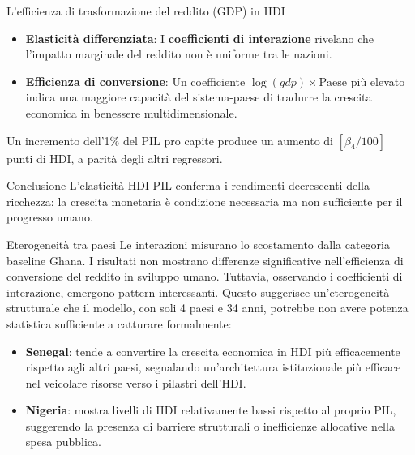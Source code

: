 \documentclass[
  ignorenonframetext,
  aspectratio=43,
]{beamer}
\begin{document}
\begin{frame}{L'efficienza di trasformazione del reddito (GDP) in HDI}
\label{lefficienza-di-trasformazione-del-reddito-gdp-in-hdi}
\begin{itemize}
  \item \textbf{Elasticità differenziata}: I \textbf{coefficienti di interazione} rivelano che l'impatto marginale del reddito non è uniforme tra le nazioni.
  \item \textbf{Efficienza di conversione}: Un coefficiente $\log(gdp) \times \text{Paese}$ più elevato indica una maggiore capacità del sistema-paese di tradurre la crescita economica in benessere multidimensionale.
\end{itemize}

Un incremento dell'1\% del PIL pro capite produce un aumento di
\([\beta_4/100]\) punti di HDI, a parità degli altri regressori.

\begin{block}{Conclusione}
L'elasticità HDI-PIL conferma i rendimenti decrescenti della ricchezza: la crescita monetaria è condizione necessaria ma non sufficiente per il progresso umano.
\end{block}
\end{frame}

\begin{frame}{Eterogeneità tra paesi}
\label{eterogeneituxe0-tra-paesi}
Le interazioni misurano lo scostamento dalla categoria baseline Ghana. I
risultati non mostrano differenze significative nell'efficienza di
conversione del reddito in sviluppo umano. Tuttavia, osservando i
coefficienti di interazione, emergono pattern interessanti. Questo
suggerisce un'eterogeneità strutturale che il modello, con soli 4 paesi
e 34 anni, potrebbe non avere potenza statistica sufficiente a catturare
formalmente:

\begin{itemize}
  \item \textbf{Senegal}: tende a convertire la crescita economica in HDI più efficacemente rispetto agli altri paesi, segnalando un'architettura istituzionale più efficace nel veicolare risorse verso i pilastri dell'HDI.
  \item \textbf{Nigeria}: mostra livelli di HDI relativamente bassi rispetto al proprio PIL, suggerendo la presenza di barriere strutturali o inefficienze allocative nella spesa pubblica.
\end{itemize}
\end{frame}
\end{document}
